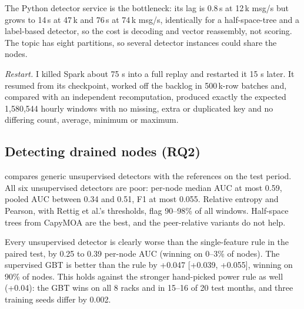 \begin{table}[t]
\caption{Throughput and latency at three replay rates (fresh stack per run). Detector lag is scoring time minus publish time.}
\label{tab:pipeline}
\centering\small

\end{table}

The Python detector service is the bottleneck: its lag is 0.8\,s at 12\,k msg/s but grows to 14\,s at 47\,k and 76\,s at 74\,k msg/s, identically for a half-space-tree and a label-based detector, so the cost is decoding and vector reassembly, not scoring. The topic has eight partitions, so several detector instances could share the nodes.

\emph{Restart.} I killed Spark about 75 s into a full replay and restarted it 15 s later. It resumed from its checkpoint, worked off the backlog in 500\,k-row batches and, compared with an independent recomputation, produced exactly the expected 1,580,544 hourly windows with no missing, extra or duplicated key and no differing count, average, minimum or maximum.

\subsection{Detecting drained nodes (RQ2)}
\label{sec:detection}
 compares generic unsupervised detectors with the references on the test period. All six unsupervised detectors are poor: per-node median AUC at most 0.59, pooled AUC between 0.34 and 0.51, F1 at most 0.055. Relative entropy and Pearson, with Rettig et al.'s thresholds, flag 90--98\% of all windows. Half-space trees from CapyMOA are the best, and the peer-relative variants do not help.

\begin{table}[t]
\caption{Detection of the current state, test 2021-01 to 2022-09. AUC is pooled, per-node AUC is the median over 146 nodes; F1 uses the best validation threshold.}
\label{tab:detection}
\centering\small

\end{table}

Every unsupervised detector is clearly worse than the single-feature rule in the paired test, by 0.25 to 0.39 per-node AUC (winning on 0--3\% of nodes). The supervised GBT is better than the rule by +0.047 [+0.039, +0.055], winning on 90\% of nodes. This holds against the stronger hand-picked power rule as well (+0.04): the GBT wins on all 8 racks and in 15--16 of 20 test months, and three training seeds differ by 0.002.

